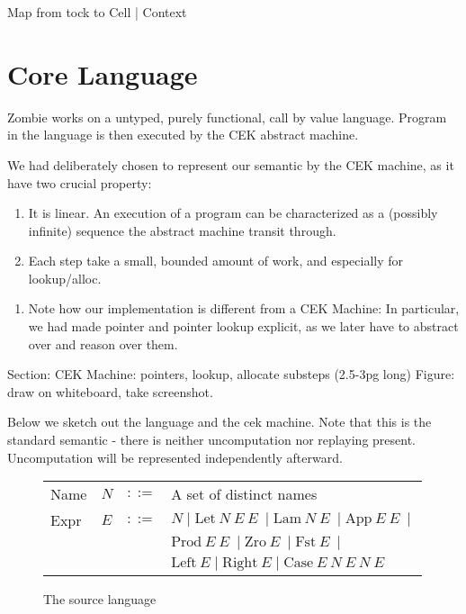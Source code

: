 \documentclass[acmsmall]{acmart}
\newcommand\tablewidth{25em}
\begin{document}
Map from tock to Cell | Context

\section{Core Language}	
Zombie works on a untyped, purely functional, call by value language. Program in the language is then executed by the CEK abstract machine.

We had deliberately chosen to represent our semantic by the CEK machine, as it have two crucial property:

\begin{enumerate}
	\item It is linear. An execution of a program can be characterized as a (possibly infinite) sequence the abstract machine transit through.

	\item Each step take a small, bounded amount of work, and especially for lookup/alloc.
\end{enumerate}

\begin{enumerate}
	\item Note how our implementation is different from a CEK Machine: In particular, we had made pointer and pointer lookup explicit, as we later have to abstract over and reason over them. 
\end{enumerate}

Section: CEK Machine: pointers, lookup, allocate substeps (2.5-3pg long)
Figure: draw on whiteboard, take screenshot.
	
Below we sketch out the language and the cek machine. Note that this is the standard semantic - there is neither uncomputation nor replaying present. Uncomputation will be represented independently afterward.
	\begin{figure}
	\begin{tabular}{lllp{\tablewidth}}
	Name & $N$ & $::=$ & A set of distinct names \\
	Expr & $E$ & $::=$ & $N\mid \text{Let}\ N\ E\ E\ \mid \text{Lam}\ N\ E\ \mid \text{App}\ E\ E\ \mid$ \\
	& & & $ \text{Prod}\ E\ E\ \mid \text{Zro}\ E\ \mid \text{Fst}\ E\ \mid $ \\
	& & & $ \text{Left}\ E\mid\text{Right}\ E\mid \text{Case}\ E\ N\ E\ N\ E $ \\
	\end{tabular}
	\caption{The source language}
	\end{figure}
\end{document}
